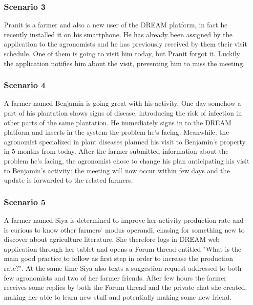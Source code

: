 \subsubsection*{Scenario 3}
Pranit is a farmer and also a new user of the DREAM platform, in fact he recently installed it on his smartphone. He has already been assigned by the application to the agronomists and he has previously received by them their visit schedule. One of them is going to visit him today, but Pranit forgot it. Luckily the application notifies him about the visit, preventing him to miss the meeting.

\subsubsection*{Scenario 4}
A farmer named Benjamin is going great with his activity. One day somehow a part of his plantation shows signs of disease, introducing the risk of infection in other parts of the same plantation. He immediately signs in to the DREAM platform and inserts in the system the problem he's facing. Meanwhile, the agronomist specialized in plant diseases planned his visit to Benjamin's property in 5 months from today. After the farmer submitted information about the problem he's facing, the agronomist chose to change his plan anticipating his visit to Benjamin's activity: the meeting will now occur within few days and the update is forwarded to the related farmers.

\subsubsection*{Scenario 5}
A farmer named Siya is determined to improve her activity production rate and is curious to know other farmers' modus operandi, chasing for something new to discover about agriculture literature. She therefore logs in DREAM web application through her tablet and opens a Forum thread entitled "What is the main good practice to follow as first step in order to increase the production rate?". At the same time Siya also texts a suggestion request addressed to both few agronomists and two of her farmer friends. After few hours the farmer receives some replies by both the Forum thread and the private chat she created, making her able to learn new stuff and potentially making some new friend.

